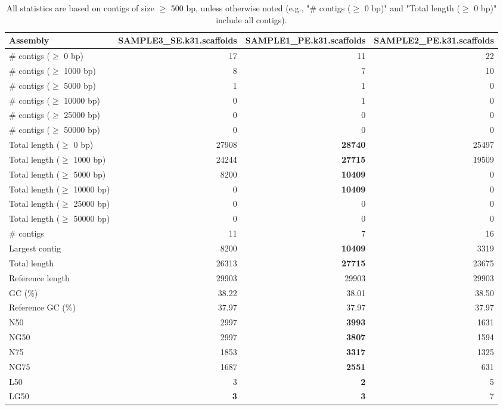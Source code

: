 \documentclass[12pt,a4paper]{article}
\begin{document}
\begin{table}[ht]
\begin{center}
\caption{All statistics are based on contigs of size $\geq$ 500 bp, unless otherwise noted (e.g., "\# contigs ($\geq$ 0 bp)" and "Total length ($\geq$ 0 bp)" include all contigs).}
\begin{tabular}{|l*{3}{|r}|}
\hline
Assembly & SAMPLE3\_SE.k31.scaffolds & SAMPLE1\_PE.k31.scaffolds & SAMPLE2\_PE.k31.scaffolds \\ \hline
\# contigs ($\geq$ 0 bp) & 17 & 11 & 22 \\ \hline
\# contigs ($\geq$ 1000 bp) & 8 & 7 & 10 \\ \hline
\# contigs ($\geq$ 5000 bp) & 1 & 1 & 0 \\ \hline
\# contigs ($\geq$ 10000 bp) & 0 & 1 & 0 \\ \hline
\# contigs ($\geq$ 25000 bp) & 0 & 0 & 0 \\ \hline
\# contigs ($\geq$ 50000 bp) & 0 & 0 & 0 \\ \hline
Total length ($\geq$ 0 bp) & 27908 & {\bf 28740} & 25497 \\ \hline
Total length ($\geq$ 1000 bp) & 24244 & {\bf 27715} & 19509 \\ \hline
Total length ($\geq$ 5000 bp) & 8200 & {\bf 10409} & 0 \\ \hline
Total length ($\geq$ 10000 bp) & 0 & {\bf 10409} & 0 \\ \hline
Total length ($\geq$ 25000 bp) & 0 & 0 & 0 \\ \hline
Total length ($\geq$ 50000 bp) & 0 & 0 & 0 \\ \hline
\# contigs & 11 & 7 & 16 \\ \hline
Largest contig & 8200 & {\bf 10409} & 3319 \\ \hline
Total length & 26313 & {\bf 27715} & 23675 \\ \hline
Reference length & 29903 & 29903 & 29903 \\ \hline
GC (\%) & 38.22 & 38.01 & 38.50 \\ \hline
Reference GC (\%) & 37.97 & 37.97 & 37.97 \\ \hline
N50 & 2997 & {\bf 3993} & 1631 \\ \hline
NG50 & 2997 & {\bf 3807} & 1594 \\ \hline
N75 & 1853 & {\bf 3317} & 1325 \\ \hline
NG75 & 1687 & {\bf 2551} & 631 \\ \hline
L50 & 3 & {\bf 2} & 5 \\ \hline
LG50 & {\bf 3} & {\bf 3} & 7 \\ \hline

\end{tabular}
\end{center}
\end{table}
\end{document}

